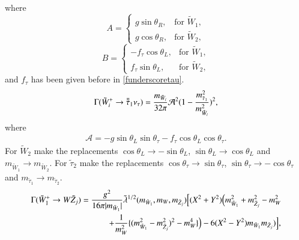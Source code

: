 \documentclass[final,3p,times]{elsarticle}
\begin{document}
where
\begin{equation}
  A=\begin{cases}
    g \sin\theta_{R}, & \text{for $\tilde{W}_1$},\\
    g \cos\theta_{R}, & \text{for $\tilde{W}_2$},
  \end{cases}
\end{equation}
\begin{equation}
  B=\begin{cases}
    -f_{\tau} \cos\theta_{L}, & \text{for $\tilde{W}_1$},\\
    f_{\tau}  \sin\theta_{L}, & \text{for $\tilde{W}_2$},
  \end{cases}
\end{equation}
and $f_\tau$ has been given before in \eqref{funderscoretau}.
\begin{equation}\label{chstau1nutau}
\begin{aligned}
\Gamma (\tilde{W}_i^+ \rightarrow \bar{\tilde{\tau}}_1 \nu_{\tau}) = {m_{\tilde{W}_i} \over 32\pi} \mathcal{A}^2 ( 1 - {m_{\tilde{\tau}_{1}}^2 \over m_{\tilde{W}_{i}}^2})^2 ,
\end{aligned}
\end{equation} 
where
\begin{equation}
\begin{aligned}
\mathcal{A} = -g\sin\theta_L\sin\theta_\tau - f_\tau \cos\theta_L\cos\theta_\tau.
\end{aligned}
\end{equation}
For $\tilde{W}_2$ make the replacements $\cos\theta_L \rightarrow -\sin\theta_L$, $\sin\theta_L \rightarrow \cos\theta_L$ and $m_{\tilde{W}_1} \rightarrow m_{\tilde{W}_2}$.
For $\tilde{\tau}_2$ make the replacements $\cos\theta_\tau \rightarrow \sin\theta_\tau$, $\sin\theta_\tau \rightarrow -\cos\theta_\tau$ and $m_{\tilde{\tau}_1} \rightarrow m_{\tilde{\tau}_2}$.
\begin{equation}\label{ch1Wneut}
\begin{aligned}
\Gamma (\tilde{W}_1^+ \rightarrow W \tilde{Z}_j) = {g^2 \over 16\pi|m_{\tilde{W}_1}| } \tilde{\lambda}^{1/2} (m_{\tilde{W}_1}, m_W, m_{\tilde{Z}_j}) \Big[(X^2 + Y^2)\Big(m_{\tilde{W}_1}^2 + m_{\tilde{Z}_j}^2 - m_{W}^2  \\ +{1 \over m_{W}^2}\{(m_{\tilde{W}_{1}}^2 - m_{\tilde{Z}_{j}}^2)^2 - m_{W}^4\}\Big) - 6(X^2 - Y^2)m_{\tilde{W}_1} m_{\tilde{Z}_j}) \Big] ,
\end{aligned}
\end{equation} 
\end{document}
